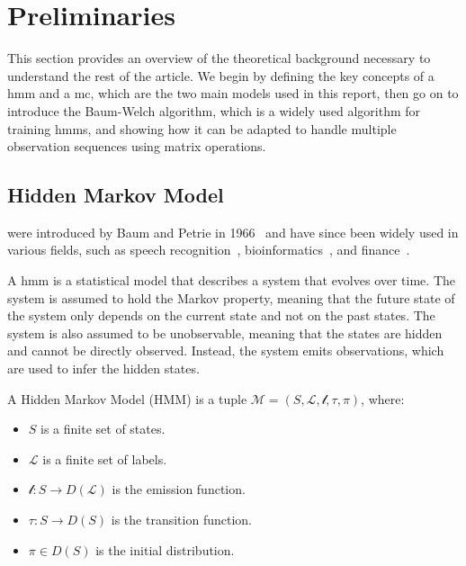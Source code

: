 \section{Preliminaries}\label{sec:preliminaries}
This section provides an overview of the theoretical background necessary to understand the rest of the article.
We begin by defining the key concepts of a \gls{hmm} and a \gls{mc}, which are the two main models used in this report, then go on to introduce the Baum-Welch algorithm, which is a widely used algorithm for training \glspl{hmm}, and showing how it can be adapted to handle multiple observation sequences using matrix operations.

\subsection{Hidden Markov Model}\label{subsec:hmm}
 were introduced by Baum and Petrie in 1966~\cite{baum1966statistical} and have since been widely used in various fields, such as speech recognition~\cite{chavan2013overview}, bioinformatics~\cite{ciocchetta2009bio}, and finance~\cite{mamon2007hidden}.

A \gls{hmm} is a statistical model that describes a system that evolves over time.
The system is assumed to hold the Markov property, meaning that the future state of the system only depends on the current state and not on the past states.
The system is also assumed to be unobservable, meaning that the states are hidden and cannot be directly observed.
Instead, the system emits observations, which are used to infer the hidden states.


\begin{definition}
    A Hidden Markov Model (HMM) is a tuple $\mathcal{M} = (S, \mathcal{L}, \mathscr{l}, \tau,  \pi)$, where:
    \begin{itemize}
        \item $S$ is a finite set of states.
        \item $\mathcal{L}$ is a finite set of labels.
        \item $\mathscr{l}: S \rightarrow D(\mathcal{L})$ is the emission function.
        \item $\tau: S \rightarrow D(S)$ is the transition function.
        \item $\pi \in D(S)$ is the initial distribution.
    \end{itemize}
\end{definition}


